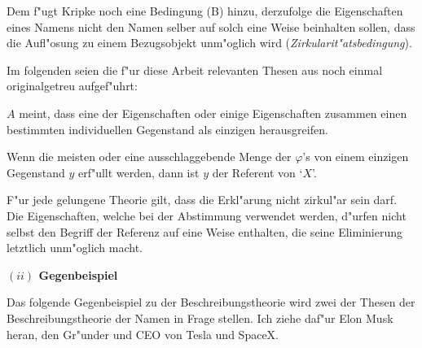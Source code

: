 \documentclass[a4paper, emulatestandardclasses, 12pt]{scrartcl}
\begin{document}
\begin{onehalfspace}
Dem f"ugt Kripke noch eine Bedingung (B) hinzu, derzufolge die Eigenschaften eines Namens nicht den Namen selber auf solch eine Weise beinhalten sollen, dass die Aufl"osung zu einem Bezugsobjekt unm"oglich wird (\emph{Zirkularit"atsbedingung}).%

\noindent Im folgenden seien die f"ur diese Arbeit relevanten Thesen aus \citep{begriffundgegenstand} noch einmal originalgetreu aufgef"uhrt:\vspace{5mm}

\begin{addmargin}[.08\linewidth]{.08\linewidth}%
\footnotesize
\begin{description}[leftmargin=!,labelwidth=\widthof{\bfseries (B)}]
    \item[(2)] $A$ meint, dass eine der Eigenschaften oder einige Eigenschaften zusammen einen bestimmten individuellen Gegenstand als einzigen herausgreifen.
    \item[(3)] Wenn die meisten oder eine ausschlaggebende Menge der $\varphi$'s von einem einzigen Gegenstand $y$ erf"ullt werden, dann ist $y$ der Referent von `$X$'.
    \item[(B)] F"ur jede gelungene Theorie gilt, dass die Erkl"arung nicht zirkul"ar sein darf. Die Eigenschaften, welche bei der Abstimmung verwendet werden, d"urfen nicht selbst den Begriff der Referenz auf eine Weise enthalten, die seine Eliminierung letztlich unm"oglich macht.
\end{description}
\end{addmargin}
\normalsize

\vspace{3mm}
\noindent\textbf{$(ii)$ Gegenbeispiel}	

\noindent Das folgende Gegenbeispiel zu der Beschreibungstheorie wird zwei der Thesen der Beschreibungstheorie der Namen in Frage stellen. Ich ziehe daf"ur Elon Musk heran, den Gr"under und CEO von Tesla und SpaceX. 


\end{onehalfspace}
\end{document}
